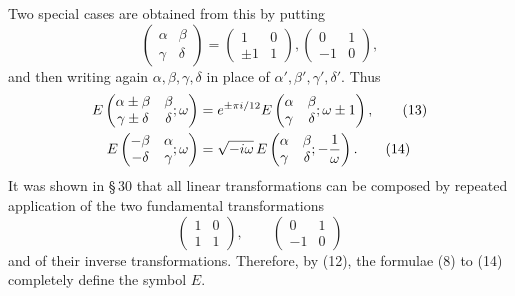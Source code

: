 \documentclass[11pt]{article}
\begin{document}
Two special cases are obtained from this by putting
\[
\begin{pmatrix}\alpha&\beta\\ \gamma&\delta\end{pmatrix}
=\begin{pmatrix}1&0\\ \pm1&1\end{pmatrix},
\begin{pmatrix}0&1\\-1&0\end{pmatrix},
\]
and then writing again $\alpha,\beta,\gamma,\delta$ in place of $\alpha',\beta',\gamma',\delta'$. Thus
\begin{align}
E\left(\begin{matrix}\alpha\pm\beta&\beta\\ \gamma\pm\delta&\delta\end{matrix};\omega\right)&=
 e^{\pm\pi i/12}E\left(\begin{matrix}\alpha&\beta\\ \gamma&\delta\end{matrix};\omega\pm1\right), \tag{13}\\
E\left(\begin{matrix}-\beta&\alpha\\ -\delta&\gamma\end{matrix};\omega\right)&=
 \sqrt{-i\omega}\,E\left(\begin{matrix}\alpha&\beta\\ \gamma&\delta\end{matrix};-{1\over\omega}\right). \tag{14}
\end{align}
It was shown in \S\,30 that all linear transformations can be composed by repeated application of the two fundamental transformations
\[
\begin{pmatrix}1&0\\1&1\end{pmatrix},
\qquad
\begin{pmatrix}0&1\\-1&0\end{pmatrix}
\]
and of their inverse transformations. Therefore, by (12), the formulae (8) to (14) completely define the symbol $E$.
\end{document}
